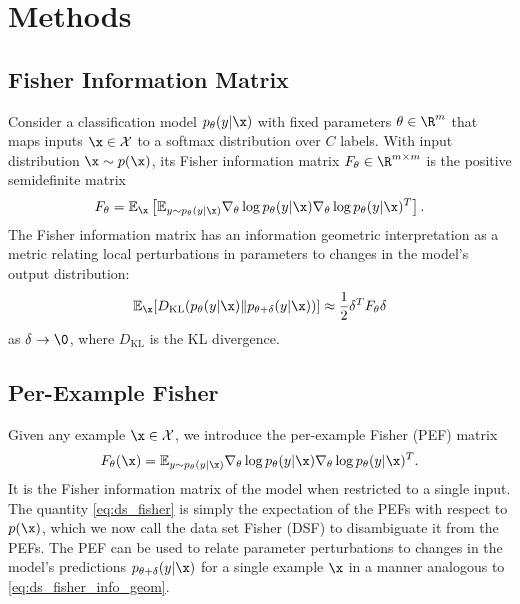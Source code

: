 \documentclass[dvipsnames]{article}
\begin{document}


\section{Methods}
\subsection{Fisher Information Matrix}
Consider a classification model $p_\theta(y|\x)$ with fixed parameters $\theta \in \R^m$ that maps inputs $\x\in\mathcal X$ to a softmax distribution over $C$ labels.
With input distribution $\x \sim p(\x)$, its Fisher information matrix $F_\theta \in \R^{m\times m}$ is the positive semidefinite matrix
\begin{equation}\label{eq:ds_fisher}
    F_\theta = \mathbb E_\x \left[\mathbb E_{y\sim p_\theta(y|\x)} \nabla_\theta \log p_\theta(y|\x) \nabla_\theta \log p_\theta(y|\x)^T \right].
\end{equation}
The Fisher information matrix has an information geometric interpretation as a metric relating local perturbations in parameters to changes in the model's output distribution:
\begin{equation}\label{eq:ds_fisher_info_geom}
    \mathbb E_\x [D_\mathrm{KL}(p_\theta(y|\x) \| p_{\theta+\delta}(y|\x))] \approx \frac12 \delta^T F_\theta \delta
\end{equation}
as $\delta \to \0$, where $D_\mathrm{KL}$ is the KL divergence.

\subsection{Per-Example Fisher}
Given any example $\x\in\mathcal X$, we introduce the per-example Fisher (PEF) matrix \begin{equation}
    F_\theta(\x) = \mathbb E_{y\sim p_\theta(y|\x)} \nabla_\theta \log p_\theta(y|\x) \nabla_\theta \log p_\theta(y|\x)^T.
\end{equation}
It is the Fisher information matrix of the model when restricted to a single input.
The quantity \eqref{eq:ds_fisher} is simply the expectation of the PEFs with respect to $p(\x)$, which we now call the data set Fisher (DSF) to disambiguate it from the PEFs.
The PEF can be used to relate parameter perturbations to changes in the model's predictions $p_{\theta+\delta}(y|\x)$ for a single example $\x$ in a manner analogous to \eqref{eq:ds_fisher_info_geom}.
\end{document}
